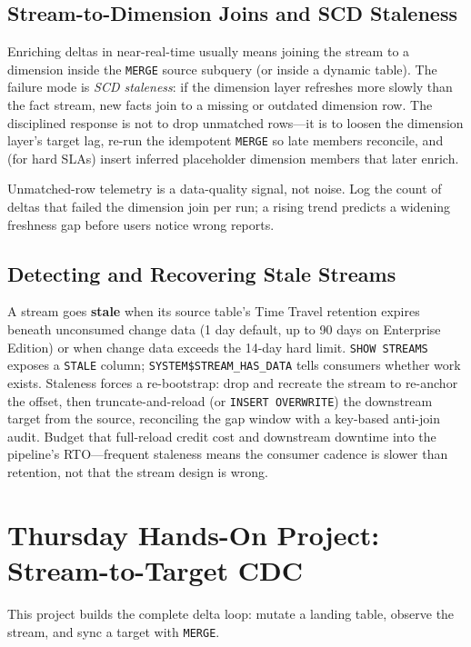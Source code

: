 \subsection{Stream-to-Dimension Joins and SCD Staleness}
Enriching deltas in near-real-time usually means joining the stream to a dimension inside the \texttt{MERGE} source subquery (or inside a dynamic table). The failure mode is \emph{SCD staleness}: if the dimension layer refreshes more slowly than the fact stream, new facts join to a missing or outdated dimension row. The disciplined response is not to drop unmatched rows---it is to loosen the dimension layer's target lag, re-run the idempotent \texttt{MERGE} so late members reconcile, and (for hard SLAs) insert inferred placeholder dimension members that later enrich.

\begin{tipbox}
Unmatched-row telemetry is a data-quality signal, not noise. Log the count of deltas that failed the dimension join per run; a rising trend predicts a widening freshness gap before users notice wrong reports.
\end{tipbox}

\subsection{Detecting and Recovering Stale Streams}
A stream goes \textbf{stale} when its source table's Time Travel retention expires beneath unconsumed change data (1 day default, up to 90 days on Enterprise Edition) or when change data exceeds the 14-day hard limit. \texttt{SHOW STREAMS} exposes a \texttt{STALE} column; \texttt{SYSTEM\$STREAM\_HAS\_DATA} tells consumers whether work exists. Staleness forces a re-bootstrap: drop and recreate the stream to re-anchor the offset, then truncate-and-reload (or \texttt{INSERT OVERWRITE}) the downstream target from the source, reconciling the gap window with a key-based anti-join audit. Budget that full-reload credit cost and downstream downtime into the pipeline's RTO---frequent staleness means the consumer cadence is slower than retention, not that the stream design is wrong.

\section{Thursday Hands-On Project: Stream-to-Target CDC}
This project builds the complete delta loop: mutate a landing table, observe the stream, and sync a target with \texttt{MERGE}.

